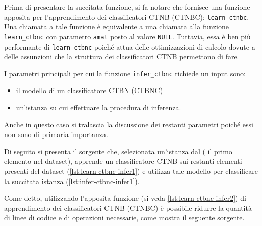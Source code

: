 Prima di presentare la succitata funzione, si fa notare che \rctbn{} fornisce una funzione apposita per l'apprendimento dei classificatori \acs{CTNB} (\acs{CTNBC}): \lstinline[language=rstats]{learn_ctnbc}. Una chiamata a tale funzione è equivalente a una chiamata alla funzione \lstinline[language=rstats]{learn_ctbnc} con parametro \lstinline$amat$ posto al valore \lstinline$NULL$. Tuttavia, essa è ben più performante di \lstinline[language=rstats]{learn_ctbnc} poiché attua delle ottimizzazioni di calcolo dovute a delle assunzioni che la struttura dei classificatori \acs{CTNB} permettono di fare.

I parametri principali per cui la funzione \lstinline[language=rstats]{infer_ctbnc} richiede un input sono:
\begin{itemize}
	\item il modello di un classificatore \acs{CTBN} (\acs{CTBNC})
	\item un'istanza su cui effettuare la procedura di inferenza.
\end{itemize}
Anche in questo caso si tralascia la discussione dei restanti parametri poiché essi non sono di primaria importanza.

Di seguito si presenta il sorgente che, selezionata un'istanza dal  (\ie{} il primo elemento nel dataset), apprende un classificatore \acs{CTNB} sui restanti elementi presenti del dataset (\autoref{lst:learn-ctbnc-infer1}) e utilizza tale modello per classificare la succitata istanza (\autoref{lst:infer-ctbnc-infer1}).

\vspace*{8pt}

Come detto, utilizzando l'apposita funzione (si veda \autoref{lst:learn-ctbnc-infer2}) di apprendimento dei classificatori \acs{CTNB} (\acs{CTNBC}) è possibile ridurre la quantità di linee di codice e di operazioni necessarie, come mostra il seguente sorgente.

\vspace*{8pt}

